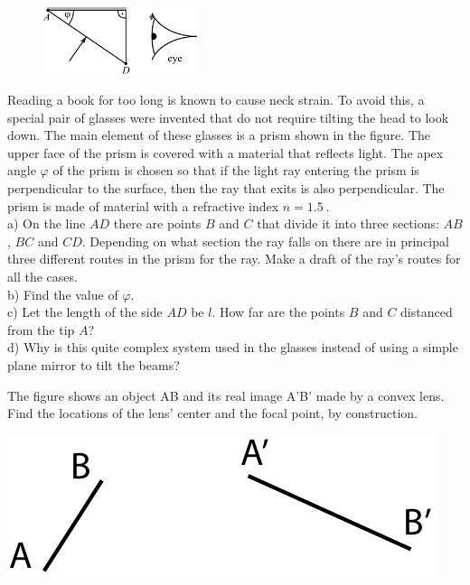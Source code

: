 \documentclass[11pt]{article}
\begin{document}

\probeng
\begin{figure}
  \begin{center}
    \includegraphics[width=0.4\textwidth]{2014-v3g-04-periskoopprillid_yl_joonis_ing}
  \end{center}
\end{figure}
Reading a book for too long is known to cause neck strain. To avoid this, a special pair of glasses were invented that do not require tilting the head to look down. The main element of these glasses is a prism shown in the figure. The upper face of the prism is covered with a material that reflects light. The apex angle $\varphi$ of the prism is chosen so that if the light ray entering the prism is perpendicular to the surface, then the ray that exits is also perpendicular. The prism is made of material with a refractive index $n=\SI{1,5}{}$.\\
a) On the line $AD$ there are points $B$ and $C$ that divide it into three sections: $AB$, $BC$ and $CD$. Depending on what section the ray falls on there are in principal three different routes in the prism for the ray. Make a draft of the ray’s routes for all the cases. \\
b) Find the value of $\varphi$.\\
c) Let the length of the side $AD$ be $l$. How far are the points $B$ and $C$ distanced from the tip $A$?\\
d) Why is this quite complex system used in the glasses instead of using a simple plane mirror to tilt the beams?
\probend
\bigskip


\probeng
The figure shows an object AB and its real image A’B’ made by a convex lens. Find the locations of the lens’ center and the focal point, by construction.
\begin{center}
 \includegraphics[width=0.7\linewidth]{2015-lahg-05-laatsMihkel}
\end{center}
\probend
\bigskip
\end{document}
